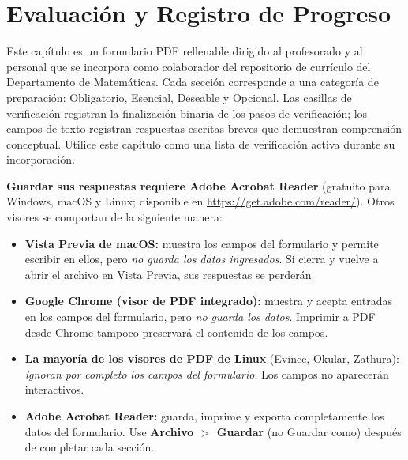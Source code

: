 \chapter{Evaluación y Registro de Progreso}
\label{ch:assessment}

\begin{Form}

Este capítulo es un formulario PDF rellenable dirigido al profesorado
y al personal que se incorpora como colaborador del repositorio de
currículo del Departamento de Matemáticas. Cada sección corresponde
a una categoría de preparación: Obligatorio, Esencial, Deseable y
Opcional. Las casillas de verificación registran la finalización
binaria de los pasos de verificación; los campos de texto registran
respuestas escritas breves que demuestran comprensión conceptual.
Utilice este capítulo como una lista de verificación activa durante
su incorporación.

\vs
\noindent
\textbf{Guardar sus respuestas requiere Adobe Acrobat Reader}
(gratuito para Windows, macOS y Linux; disponible en
\url{https://get.adobe.com/reader/}). Otros visores se comportan
de la siguiente manera:

\begin{itemize}
    \item \textbf{Vista Previa de macOS:} muestra los campos del
          formulario y permite escribir en ellos, pero \emph{no guarda
          los datos ingresados}. Si cierra y vuelve a abrir el archivo
          en Vista Previa, sus respuestas se perderán.
    \item \textbf{Google Chrome (visor de PDF integrado):} muestra y
          acepta entradas en los campos del formulario, pero \emph{no
          guarda los datos}. Imprimir a PDF desde Chrome tampoco
          preservará el contenido de los campos.
    \item \textbf{La mayoría de los visores de PDF de Linux} (Evince,
          Okular, Zathura): \emph{ignoran por completo los campos del
          formulario}. Los campos no aparecerán interactivos.
    \item \textbf{Adobe Acrobat Reader:} guarda, imprime y exporta
          completamente los datos del formulario. Use \textbf{Archivo
          $>$ Guardar} (no Guardar como) después de completar cada
          sección.
\end{itemize}


\end{Form}
